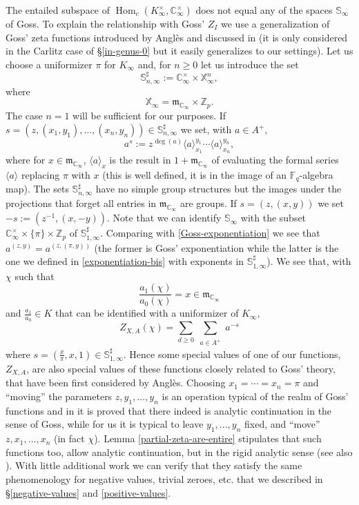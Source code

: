 \documentclass[11pt]{amsart}
\numberwithin{equation}{section}
\newcommand{\ZZ}{\mathbb{Z}}
\newcommand{\FF}{\mathbb{F}}
\newcommand{\CC}{\mathbb{C}}
\begin{document}
The entailed subspace of $\operatorname{Hom}_c(K_\infty^\times,\CC_\infty^\times)$ does not equal any of the spaces $\mathbb{S}_\infty$ of Goss. 
To explain the relationship with Goss' $Z_I$ we use a generalization of Goss' zeta functions introduced by Angl\`es
and discussed in \cite[Example 5.12]{GOS3} (it is only considered in the Carlitz case of \S \ref{in-genus-0} but it easily generalizes to our settings). Let us choose a uniformizer $\pi$ for $K_\infty$ and, for $n\geq 0$ let us introduce the set
$$\mathbb{S}_{n,\infty}^\sharp:=\CC_\infty^\times\times\mathbb{X}_\infty^n,$$
where $$\mathbb{X}_\infty=\mathfrak{m}_{\CC_\infty}\times\ZZ_p.$$ The case $n=1$ will be sufficient for our purposes.
If $s=(z,(x_1,y_1),\ldots,(x_n,y_n))\in\mathbb{S}_{n,\infty}^\sharp$ we set, with $a\in A^+$,
\begin{equation}\label{exponentiation-bis}
a^s:=z^{\deg(a)}\langle a\rangle_{x_1}^{y_1}\cdots\langle a\rangle_{x_n}^{y_n},
\end{equation}
where for $x\in\mathfrak{m}_{\CC_\infty}$, $\langle a\rangle_{x}$ is the result in $1+\mathfrak{m}_{\CC_\infty}$ of evaluating the formal series $\langle a\rangle$ replacing $\pi$ with $x$ (this is well defined, it is in the image of an $\FF_q$-algebra map).
The sets $\mathbb{S}_{n,\infty}^\sharp$ have no simple group structures but the images under the projections that forget all entries in $\mathfrak{m}_{\CC_\infty}$ are groups. If $s=(z,(x,y))$
we set $-s:=(z^{-1},(x,-y))$.
Note that we can identify $\mathbb{S}_{\infty}$ with the subset $\CC_\infty^\times\times\{\pi\}\times\ZZ_p$ of 
$\mathbb{S}_{1,\infty}^\sharp$. Comparing with 
\eqref{Goss-exponentiation} we see that $a^{(z,y)}=a^{(z,(\pi,y))}$ (the former is Goss' exponentiation while the latter is the one we defined in \eqref{exponentiation-bis} with exponents in
$\mathbb{S}_{1,\infty}^\sharp$). We see that, with $\chi$ such that $$\frac{a_1(\chi)}{a_0(\chi)}=x\in\mathfrak{m}_{\CC_\infty}$$
and $\frac{a_1}{a_0}\in K$ that can be identified with a uniformizer of $K_\infty$,
$$Z_{X,A}(\chi)=\sum_{d\geq 0}\sum_{\begin{smallmatrix}a\in A^+\end{smallmatrix}}a^{-s}$$
where $s=(\frac{x}{\pi},x,1)\in\mathbb{S}_{1,\infty}^\sharp$. Hence some special values of one of our functions, $Z_{X,A}$,
are also special values of these functions closely related to Goss' theory, that have been first considered by Angl\`es. Choosing $x_1=\cdots=x_n=\pi$ and ``moving'' the parameters $z,y_1,\ldots,y_n$ is an operation typical of the realm of Goss' functions and in \cite[Proposition 5.13]{GOS3} it is proved that there indeed is analytic continuation in the sense of Goss, while for us it is typical to leave $y_1,\ldots, y_n$ fixed, and ``move'' $z,x_1,\ldots,x_n$ (in fact $\chi$). Lemma \ref{partial-zeta-are-entire} 
stipulates that such functions too, allow analytic continuation, but in the rigid analytic sense (see also \cite[Lemma 5.17]{GOS3}). With little additional work we can verify that they satisfy the same phenomenology for negative values, trivial zeroes, etc. that we described in \S \ref{negative-values} and \ref{positive-values}.
\end{document}
